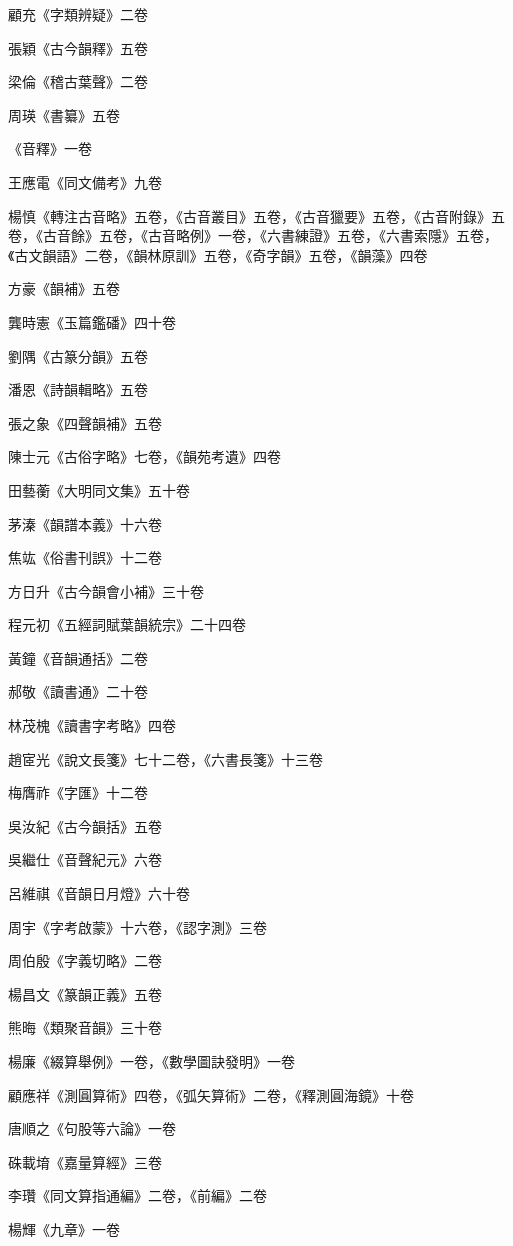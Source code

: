 顧充《字類辨疑》二卷

張穎《古今韻釋》五卷

梁倫《稽古葉聲》二卷

周瑛《書纂》五卷

《音釋》一卷

王應電《同文備考》九卷

楊慎《轉注古音略》五卷，《古音叢目》五卷，《古音獵要》五卷，《古音附錄》五卷，《古音餘》五卷，《古音略例》一卷，《六書練證》五卷，《六書索隱》五卷，《古文韻語》二卷，《韻林原訓》五卷，《奇字韻》五卷，《韻藻》四卷

方豪《韻補》五卷

龔時憲《玉篇鑑磻》四十卷

劉隅《古篆分韻》五卷

潘恩《詩韻輯略》五卷

張之象《四聲韻補》五卷

陳士元《古俗字略》七卷，《韻苑考遺》四卷

田藝蘅《大明同文集》五十卷

茅溱《韻譜本義》十六卷

焦竑《俗書刊誤》十二卷

方日升《古今韻會小補》三十卷

程元初《五經詞賦葉韻統宗》二十四卷

黃鐘《音韻通括》二卷

郝敬《讀書通》二十卷

林茂槐《讀書字考略》四卷

趙宧光《說文長箋》七十二卷，《六書長箋》十三卷

梅膺祚《字匯》十二卷

吳汝紀《古今韻括》五卷

吳繼仕《音聲紀元》六卷

呂維祺《音韻日月燈》六十卷

周宇《字考啟蒙》十六卷，《認字測》三卷

周伯殷《字義切略》二卷

楊昌文《篆韻正義》五卷

熊晦《類聚音韻》三十卷

楊廉《綴算舉例》一卷，《數學圖訣發明》一卷

顧應祥《測圓算術》四卷，《弧矢算術》二卷，《釋測圓海鏡》十卷

唐順之《句股等六論》一卷

硃載堉《嘉量算經》三卷

李瓚《同文算指通編》二卷，《前編》二卷

楊輝《九章》一卷

